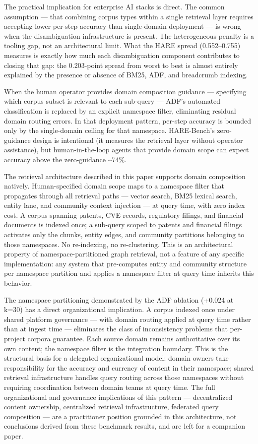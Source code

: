 The practical implication for enterprise AI stacks is direct. The common assumption --- that combining corpus types within a single retrieval layer requires accepting lower per-step accuracy than single-domain deployment --- is wrong when the disambiguation infrastructure is present. The heterogeneous penalty is a tooling gap, not an architectural limit. What the HARE spread (0.552--0.755) measures is exactly how much each disambiguation component contributes to closing that gap: the 0.203-point spread from worst to best is almost entirely explained by the presence or absence of BM25, ADF, and breadcrumb indexing.

When the human operator provides domain composition guidance --- specifying which corpus subset is relevant to each sub-query --- ADF's automated classification is replaced by an explicit namespace filter, eliminating residual domain routing errors. In that deployment pattern, per-step accuracy is bounded only by the single-domain ceiling for that namespace. HARE-Bench's zero-guidance design is intentional (it measures the retrieval layer without operator assistance), but human-in-the-loop agents that provide domain scope can expect accuracy above the zero-guidance \textasciitilde74\%.

The retrieval architecture described in this paper supports domain composition natively. Human-specified domain scope maps to a namespace filter that propagates through all retrieval paths --- vector search, BM25 lexical search, entity lane, and community context injection --- at query time, with zero index cost. A corpus spanning patents, CVE records, regulatory filings, and financial documents is indexed once; a sub-query scoped to patents and financial filings activates only the chunks, entity edges, and community partitions belonging to those namespaces. No re-indexing, no re-clustering. This is an architectural property of namespace-partitioned graph retrieval, not a feature of any specific implementation: any system that pre-computes entity and community structure per namespace partition and applies a namespace filter at query time inherits this behavior.

The namespace partitioning demonstrated by the ADF ablation (+0.024 at k=30) has a direct organizational implication. A corpus indexed once under shared platform governance --- with domain routing applied at query time rather than at ingest time --- eliminates the class of inconsistency problems that per-project corpora guarantee. Each source domain remains authoritative over its own content; the namespace filter is the integration boundary. This is the structural basis for a delegated organizational model: domain owners take responsibility for the accuracy and currency of content in their namespace; shared retrieval infrastructure handles query routing across those namespaces without requiring coordination between domain teams at query time. The full organizational and governance implications of this pattern --- decentralized content ownership, centralized retrieval infrastructure, federated query composition --- are a practitioner position grounded in this architecture, not conclusions derived from these benchmark results, and are left for a companion paper.

